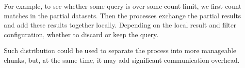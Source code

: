 \begin{figure}[H]
	\scalebox{0.8}{}
\end{figure}

\begin{exmp}
For example, to see whether some query is over some count limit, we first count matches in the partial datasets. Then the processes exchange the partial results and add these results together locally. Depending on the local result and filter configuration, whether to discard or keep the query.
\end{exmp}

Such distribution could be used to separate the process into more manageable chunks, but, at the same time, it may add significant communication overhead.